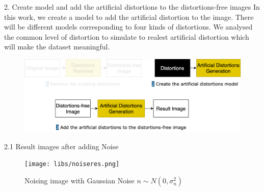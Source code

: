 \documentclass{libs/ufc_format}
\begin{document}
\begin{frame}{2. Create model and add the artificial distortions to the distortions-free images}
    In this work, we create a model to add the artificial distortion to the image. There will be  different models corresponding to four kinds of distortions. We analysed the common level of distortion to simulate to realest artificial distortion which will make the dataset meaningful.
    \begin{figure}
        \includegraphics[width=\textwidth]{libs/stage2.png}
    \end{figure}
\end{frame}


\begin{frame}{2.1 Result images after adding Noise}






    \begin{figure}
        \centering
        \texttt{[image: libs/noiseres.png]}
        \caption{Noising image with Gaussian Noise $n \sim N(0, \sigma^2_n)$}
        \label{noise_inpainted}
    \end{figure}
\end{frame}
\end{document}
